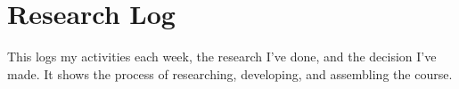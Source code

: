 
\chapter{Research Log}

This logs my activities each week, the research I've done, and the decision I've made.  It shows the process of researching, developing, and assembling the course.













